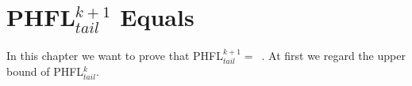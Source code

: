 
\chapter{PHFL$^{k + 1}_{tail}$ Equals }
\label{ch:phfl_k_plus_1_tail_equals_k_expspace}
In this chapter we want to prove that PHFL$^{k + 1}_{tail} =$~. At first we regard the upper bound of
PHFL$^{k}_{tail}$.


